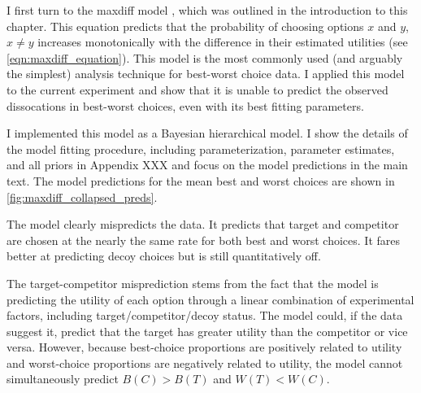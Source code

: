 {{{{

I first turn to the maxdiff model \parencite{marleyProbabilisticModelsBest2005}, which was outlined in the introduction to this chapter. This equation predicts that the probability of choosing options $x$ and $y$, $x \neq y$ increases monotonically with the difference in their estimated utilities (see \ref{eqn:maxdiff_equation}). This model is the most commonly used (and arguably the simplest) analysis technique for best-worst choice data. I applied this model to the current experiment and show that it is unable to predict the observed dissocations in best-worst choices, even with its best fitting parameters.

I implemented this model as a Bayesian hierarchical model. I show the details of the model fitting procedure, including parameterization, parameter estimates, and all priors in Appendix XXX and focus on the model predictions in the main text. The model predictions for the mean best and worst choices are shown in \ref{fig:maxdiff_collapsed_preds}.

The model clearly mispredicts the data. It predicts that target and competitor are chosen at the nearly the same rate for both best and worst choices. It fares better at predicting decoy choices but is still quantitatively off.

The target-competitor misprediction stems from the fact that the model is predicting the utility of each option through a linear combination of experimental factors, including target/competitor/decoy status. The model could, if the data suggest it, predict that the target has greater utility than the competitor or vice versa. However, because best-choice proportions are positively related to utility and worst-choice proportions are negatively related to utility, the model cannot simultaneously predict $B(C)>B(T)$ and $W(T)<W(C)$. 

}}}}
